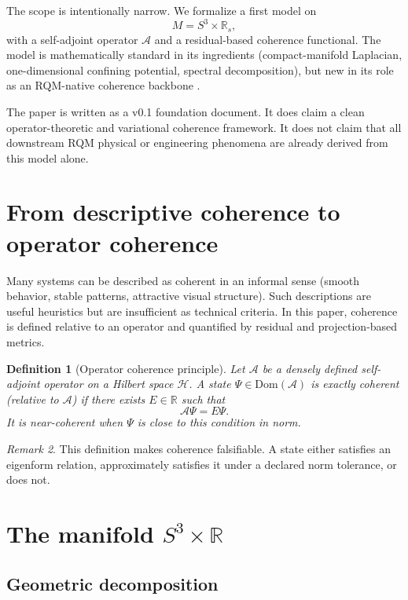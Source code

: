 \documentclass[11pt]{article}
\newtheorem{definition}{Definition}[section]
\theoremstyle{remark}
\newtheorem{remark}[definition]{Remark}
\newcommand{\R}{\mathbb{R}}
\newcommand{\Aop}{\mathcal{A}}
\begin{document}
The scope is intentionally narrow. We formalize a first model on
\[
M=S^3\times\R_s,
\]
with a self-adjoint operator $\Aop$ and a residual-based coherence functional. The model is mathematically standard in its ingredients (compact-manifold Laplacian, one-dimensional confining potential, spectral decomposition), but new in its role as an RQM-native coherence backbone \citep{hall2015,chavel1984,reed1978iv}.

The paper is written as a v0.1 foundation document. It does claim a clean operator-theoretic and variational coherence framework. It does not claim that all downstream RQM physical or engineering phenomena are already derived from this model alone.

\section{From descriptive coherence to operator coherence}

Many systems can be described as coherent in an informal sense (smooth behavior, stable patterns, attractive visual structure). Such descriptions are useful heuristics but are insufficient as technical criteria. In this paper, coherence is defined relative to an operator and quantified by residual and projection-based metrics.

\begin{definition}[Operator coherence principle]
Let $\Aop$ be a densely defined self-adjoint operator on a Hilbert space $\mathcal{H}$. A state $\Psi\in\mathrm{Dom}(\Aop)$ is \emph{exactly coherent} (relative to $\Aop$) if there exists $E\in\R$ such that
\[
\Aop\Psi=E\Psi.
\]
It is \emph{near-coherent} when $\Psi$ is close to this condition in norm.
\end{definition}

\begin{remark}
This definition makes coherence falsifiable. A state either satisfies an eigenform relation, approximately satisfies it under a declared norm tolerance, or does not.
\end{remark}

\section{The manifold \texorpdfstring{$S^3\times\R$}{S3 x R}}

\subsection{Geometric decomposition}
\end{document}
